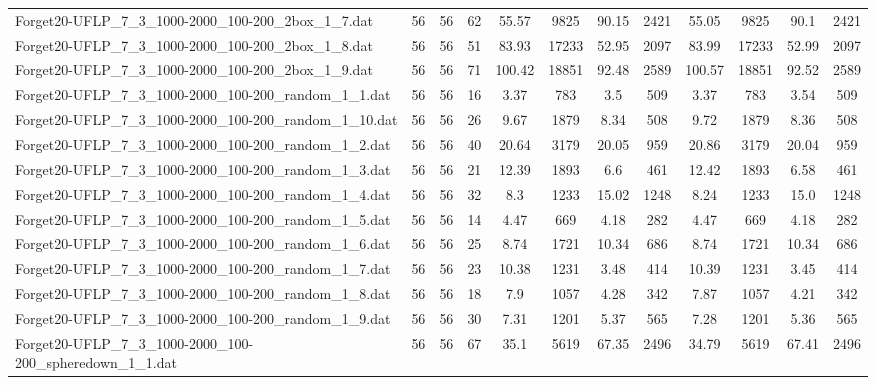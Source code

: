 \begin{sidewaystable}[!ht]
{\begin{tabular}{lccccccccccc}
Forget20-UFLP\_7\_3\_1000-2000\_100-200\_2box\_1\_7.dat & 56 & 56 & 62 & 55.57 & 9825 & 90.15 & 2421 & 55.05 & 9825 & 90.1 & 2421 \\
Forget20-UFLP\_7\_3\_1000-2000\_100-200\_2box\_1\_8.dat & 56 & 56 & 51 & 83.93 & 17233 &  \textcolor{blue2}{52.95} & 2097 & 83.99 & 17233 & 52.99 & 2097 \\
Forget20-UFLP\_7\_3\_1000-2000\_100-200\_2box\_1\_9.dat & 56 & 56 & 71 & 100.42 & 18851 &  \textcolor{blue2}{92.48} & 2589 & 100.57 & 18851 & 92.52 & 2589 \\
Forget20-UFLP\_7\_3\_1000-2000\_100-200\_random\_1\_1.dat & 56 & 56 & 16 & 3.37 & 783 & 3.5 & 509 & 3.37 & 783 & 3.54 & 509 \\
Forget20-UFLP\_7\_3\_1000-2000\_100-200\_random\_1\_10.dat & 56 & 56 & 26 & 9.67 & 1879 &  \textcolor{blue2}{8.34} & 508 & 9.72 & 1879 & 8.36 & 508 \\
Forget20-UFLP\_7\_3\_1000-2000\_100-200\_random\_1\_2.dat & 56 & 56 & 40 & 20.64 & 3179 & 20.05 & 959 & 20.86 & 3179 &  \textcolor{blue2}{20.04} & 959 \\
Forget20-UFLP\_7\_3\_1000-2000\_100-200\_random\_1\_3.dat & 56 & 56 & 21 & 12.39 & 1893 & 6.6 & 461 & 12.42 & 1893 &  \textcolor{blue2}{6.58} & 461 \\
Forget20-UFLP\_7\_3\_1000-2000\_100-200\_random\_1\_4.dat & 56 & 56 & 32 & 8.3 & 1233 & 15.02 & 1248 &  \textcolor{blue2}{8.24} & 1233 & 15.0 & 1248 \\
Forget20-UFLP\_7\_3\_1000-2000\_100-200\_random\_1\_5.dat & 56 & 56 & 14 & 4.47 & 669 &  \textcolor{blue2}{4.18} & 282 & 4.47 & 669 &  \textcolor{blue2}{4.18} & 282 \\
Forget20-UFLP\_7\_3\_1000-2000\_100-200\_random\_1\_6.dat & 56 & 56 & 25 &  \textcolor{blue2}{8.74} & 1721 & 10.34 & 686 &  \textcolor{blue2}{8.74} & 1721 & 10.34 & 686 \\
Forget20-UFLP\_7\_3\_1000-2000\_100-200\_random\_1\_7.dat & 56 & 56 & 23 & 10.38 & 1231 & 3.48 & 414 & 10.39 & 1231 &  \textcolor{blue2}{3.45} & 414 \\
Forget20-UFLP\_7\_3\_1000-2000\_100-200\_random\_1\_8.dat & 56 & 56 & 18 & 7.9 & 1057 & 4.28 & 342 & 7.87 & 1057 &  \textcolor{blue2}{4.21} & 342 \\
Forget20-UFLP\_7\_3\_1000-2000\_100-200\_random\_1\_9.dat & 56 & 56 & 30 & 7.31 & 1201 & 5.37 & 565 & 7.28 & 1201 &  \textcolor{blue2}{5.36} & 565 \\
Forget20-UFLP\_7\_3\_1000-2000\_100-200\_spheredown\_1\_1.dat & 56 & 56 & 67 & 35.1 & 5619 & 67.35 & 2496 &  \textcolor{blue2}{34.79} & 5619 & 67.41 & 2496 \\

\end{tabular}}
\end{sidewaystable}
